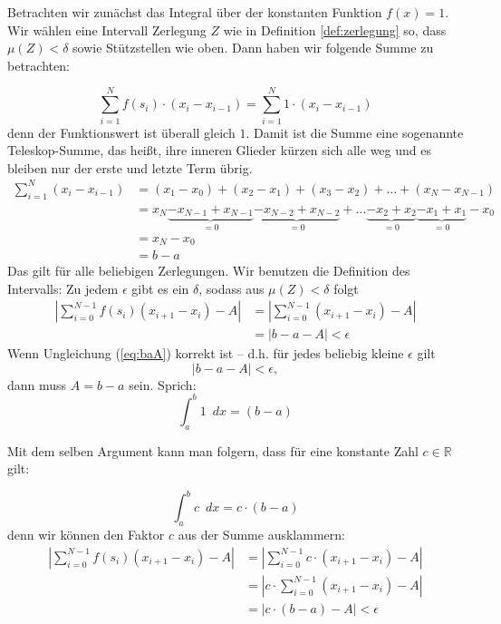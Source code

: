 Betrachten wir zunächst das Integral über der konstanten Funktion $f(x)=1$. Wir wählen eine Intervall Zerlegung $Z$ wie in Definition \ref{def:zerlegung} so, dass $\mu(Z)<\delta$ sowie Stützstellen wie oben. Dann haben wir folgende Summe zu betrachten:

\begin{equation}
\sum_{i=1}^{N} f(s_i)\cdot (x_{i}-x_{i-1}) = \sum_{i=1}^{N} 1\cdot (x_{i}-x_{i-1})
\end{equation}
denn der Funktionswert ist überall gleich $1$. Damit ist die Summe eine sogenannte Teleskop-Summe, das heißt, ihre inneren Glieder kürzen sich alle weg und es bleiben nur der erste und letzte Term übrig.
\begin{equation}
\begin{split}
\sum_{i=1}^{N} (x_{i}-x_{i-1}) &=(x_1-x_0)+(x_2-x_1)+(x_3-x_2)+\dots +(x_N-x_{N-1}) \\
&= x_N\underbrace{-x_{N-1}+x_{N-1}}_{=0} \underbrace{-x_{N-2}+x_{N-2}}_{=0}+ \dots \underbrace{-x_2+x_2}_{=0} \underbrace{-x_1+x_1}_{=0}-x_0 \\
&= x_N-x_0\\
&=b-a
\end{split}
\end{equation}
Das gilt für alle beliebigen Zerlegungen. Wir benutzen die Definition des Intervalls: Zu jedem $\epsilon$ gibt es ein $\delta$, sodass aus $\mu(Z)<\delta$ folgt
\begin{equation}\label{eq:baA}
\begin{split}
\left| \sum_{i=0}^{N-1} f(s_i)(x_{i+1}-x_i) -A \right| &= \left| \sum_{i=0}^{N-1} (x_{i+1}-x_i) -A \right| \\ 
&=\left| b-a - A \right| < \epsilon
\end{split}
\end{equation}
Wenn Ungleichung (\ref{eq:baA}) korrekt ist -- d.h. für jedes beliebig kleine $\epsilon$ gilt 
\begin{equation}
|b-a-A|<\epsilon,
\end{equation}
dann muss $A=b-a$ sein. Sprich:
\begin{equation}
\int_a^b 1 \enspace dx = (b-a)
\end{equation}

Mit dem selben Argument kann man folgern, dass für eine konstante Zahl $c\in \mathbb{R}$ gilt:

\begin{equation}
\int_a^b c \enspace dx = c\cdot(b-a)
\end{equation}
denn wir können den Faktor $c$ aus der Summe ausklammern:
\begin{equation}
\begin{split}
\left| \sum_{i=0}^{N-1} f(s_i)(x_{i+1}-x_i) -A \right| &= \left| \sum_{i=0}^{N-1} c\cdot (x_{i+1}-x_i) -A \right| \\ 
&=\left| c\cdot \sum_{i=0}^{N-1} (x_{i+1}-x_i) -A \right|\\
&=\left| c\cdot (b-a) -A \right| < \epsilon
\end{split}
\end{equation}

